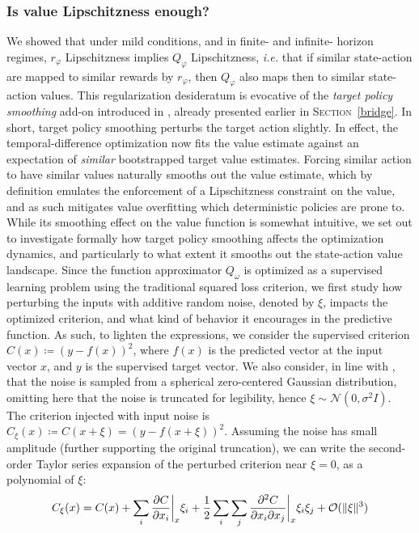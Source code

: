 \subsubsection{Is value Lipschitzness enough?}
\label{notenough}

We showed that under mild conditions, and in finite- and infinite- horizon regimes,
$r_\varphi$ Lipschitzness implies $Q_\varphi$ Lipschitzness, \textit{i.e.}
that if similar state-action are mapped to similar rewards by $r_\varphi$,
then $Q_\varphi$ also maps then to similar state-action values.
This regularization desideratum is evocative of the
\emph{target policy smoothing} add-on introduced in \cite{Fujimoto2018-pe},
already presented earlier in \textsc{Section}~\ref{bridge}.
In short, target policy smoothing perturbs the target action slightly.
In effect, the temporal-difference optimization now fits the value estimate against an expectation
of \emph{similar} bootstrapped target value estimates.
Forcing similar action to have similar values naturally smooths out the value estimate,
which by definition emulates the enforcement of a Lipschitzness constraint on the value,
and as such mitigates value overfitting which
deterministic policies are prone to.
While its smoothing effect on the value function is somewhat intuitive,
we set out to investigate formally how target policy smoothing
affects the optimization dynamics, and particularly to what extent it smooths out
the state-action value landscape.
Since the function approximator $Q_\omega$ is optimized as a supervised learning problem
using the traditional squared loss criterion, we first study how perturbing the inputs with
additive random noise, denoted by $\xi$, impacts the optimized criterion,
and what kind of behavior it encourages in the predictive function.
As such, to lighten the expressions, we consider the supervised criterion
$C(x) \coloneqq (y - f(x))^2$,
where $f(x)$ is the predicted vector
at the input vector $x$, and $y$ is the supervised target vector.
We also consider, in line with \cite{Fujimoto2018-pe}, that the noise is
sampled from a spherical zero-centered Gaussian distribution,
omitting here that the noise is truncated for legibility,
hence $\xi \sim \mathcal{N}(0, \sigma^2 I)$.
The criterion injected with input noise is
$C_\xi (x) \coloneqq C (x + \xi) = (y - f(x + \xi))^2$.
Assuming the noise has small amplitude (further supporting the original truncation),
we can write the second-order Taylor series expansion of the perturbed criterion near $\xi=0$,
as a polynomial of $\xi$:
\begin{align}
C_\xi (x) = C(x)
+ \sum_i \pdv{C}{x_i} \bigg\rvert_{x} \xi_i
+ \frac{1}{2} \sum_i\sum_j \pdv{C}{x_i}{x_j} \bigg\rvert_{x} \xi_i \xi_j
+ \mathcal{O}(\lVert \xi \rVert ^3)
\end{align}
